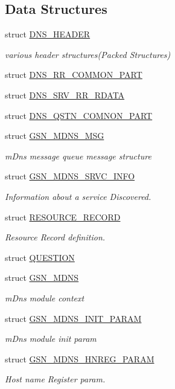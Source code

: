\subsection*{Data Structures}
\begin{DoxyCompactItemize}
\item 
struct \hyperlink{a00013}{DNS\_\-HEADER}
\begin{DoxyCompactList}\small\item\em various header structures(Packed Structures) \end{DoxyCompactList}\item 
struct \hyperlink{a00015}{DNS\_\-RR\_\-COMMON\_\-PART}
\item 
struct \hyperlink{a00016}{DNS\_\-SRV\_\-RR\_\-RDATA}
\item 
struct \hyperlink{a00014}{DNS\_\-QSTN\_\-COMNON\_\-PART}
\item 
struct \hyperlink{a00145}{GSN\_\-MDNS\_\-MSG}
\begin{DoxyCompactList}\small\item\em mDns message queue message structure \end{DoxyCompactList}\item 
struct \hyperlink{a00146}{GSN\_\-MDNS\_\-SRVC\_\-INFO}
\begin{DoxyCompactList}\small\item\em Information about a service Discovered. \end{DoxyCompactList}\item 
struct \hyperlink{a00457}{RESOURCE\_\-RECORD}
\begin{DoxyCompactList}\small\item\em Resource Record definition. \end{DoxyCompactList}\item 
struct \hyperlink{a00455}{QUESTION}
\item 
struct \hyperlink{a00140}{GSN\_\-MDNS}
\begin{DoxyCompactList}\small\item\em mDns module context \end{DoxyCompactList}\item 
struct \hyperlink{a00144}{GSN\_\-MDNS\_\-INIT\_\-PARAM}
\begin{DoxyCompactList}\small\item\em mDns module init param \end{DoxyCompactList}\item 
struct \hyperlink{a00143}{GSN\_\-MDNS\_\-HNREG\_\-PARAM}
\begin{DoxyCompactList}\small\item\em Host name Register param. \end{DoxyCompactList}\item 

\end{DoxyCompactItemize}
